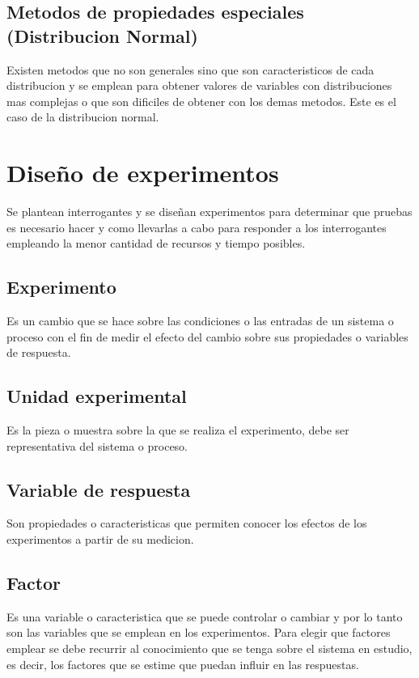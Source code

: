 \documentclass[a4paper]{article}
\begin{document}
\subsection*{Metodos de propiedades especiales (Distribucion Normal)}
Existen metodos que no son generales sino que son caracteristicos de cada distribucion y se emplean para obtener valores 
de variables con distribuciones mas complejas o que son dificiles de obtener con los demas metodos.
Este es el caso de la distribucion normal. %

\section*{Diseño de experimentos}
Se plantean interrogantes y se diseñan experimentos para determinar que pruebas es necesario hacer y como llevarlas a cabo para responder
a los interrogantes empleando la menor cantidad de recursos y tiempo posibles.

\subsection*{Experimento}
Es un cambio que se hace sobre las condiciones o las entradas de un sistema o proceso con el fin de medir el efecto del cambio sobre 
sus propiedades o variables de respuesta.

\subsection*{Unidad experimental}
Es la pieza o muestra sobre la que se realiza el experimento, debe ser representativa del sistema o proceso.

\subsection*{Variable de respuesta}
Son propiedades o caracteristicas que permiten conocer los efectos de los experimentos a partir de su medicion.

\subsection*{Factor}
Es una variable o caracteristica que se puede controlar o cambiar y por lo tanto son las variables que se emplean 
en los experimentos. Para elegir que factores emplear se debe recurrir al conocimiento que se tenga sobre el 
sistema en estudio, es decir, los factores que se estime que puedan influir en las respuestas.
\end{document}
